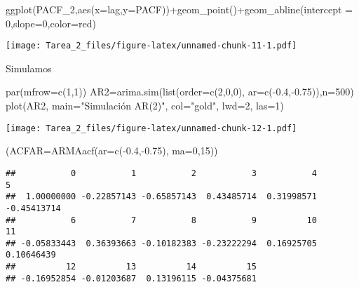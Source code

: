 \documentclass[
]{article}
\newenvironment{Shaded}{\begin{snugshade}}{\end{snugshade}}
\newcommand{\AttributeTok}[1]{\textcolor[rgb]{0.77,0.63,0.00}{#1}}
\newcommand{\DecValTok}[1]{\textcolor[rgb]{0.00,0.00,0.81}{#1}}
\newcommand{\FloatTok}[1]{\textcolor[rgb]{0.00,0.00,0.81}{#1}}
\newcommand{\FunctionTok}[1]{\textcolor[rgb]{0.00,0.00,0.00}{#1}}
\newcommand{\NormalTok}[1]{#1}
\newcommand{\OtherTok}[1]{\textcolor[rgb]{0.56,0.35,0.01}{#1}}
\newcommand{\SpecialCharTok}[1]{\textcolor[rgb]{0.00,0.00,0.00}{#1}}
\newcommand{\StringTok}[1]{\textcolor[rgb]{0.31,0.60,0.02}{#1}}
\begin{document}
\begin{Shaded}
\begin{Highlighting}[]
\FunctionTok{ggplot}\NormalTok{(PACF\_2,}\FunctionTok{aes}\NormalTok{(}\AttributeTok{x=}\NormalTok{lag,}\AttributeTok{y=}\NormalTok{PACF))}\SpecialCharTok{+}\FunctionTok{geom\_point}\NormalTok{()}\SpecialCharTok{+}\FunctionTok{geom\_abline}\NormalTok{(}\AttributeTok{intercept =} \DecValTok{0}\NormalTok{,}\AttributeTok{slope=}\DecValTok{0}\NormalTok{,}\AttributeTok{color=}\StringTok{\textquotesingle{}red\textquotesingle{}}\NormalTok{)}
\end{Highlighting}
\end{Shaded}

\texttt{[image: Tarea\_2\_files/figure-latex/unnamed-chunk-11-1.pdf]}

Simulamos

\begin{Shaded}
\begin{Highlighting}[]
\FunctionTok{par}\NormalTok{(}\AttributeTok{mfrow=}\FunctionTok{c}\NormalTok{(}\DecValTok{1}\NormalTok{,}\DecValTok{1}\NormalTok{))}
\NormalTok{AR2}\OtherTok{=}\FunctionTok{arima.sim}\NormalTok{(}\FunctionTok{list}\NormalTok{(}\AttributeTok{order=}\FunctionTok{c}\NormalTok{(}\DecValTok{2}\NormalTok{,}\DecValTok{0}\NormalTok{,}\DecValTok{0}\NormalTok{), }\AttributeTok{ar=}\FunctionTok{c}\NormalTok{(}\SpecialCharTok{{-}}\FloatTok{0.4}\NormalTok{,}\SpecialCharTok{{-}}\FloatTok{0.75}\NormalTok{)),}\AttributeTok{n=}\DecValTok{500}\NormalTok{)}
\FunctionTok{plot}\NormalTok{(AR2, }\AttributeTok{main=}\StringTok{"Simulación AR(2)"}\NormalTok{, }\AttributeTok{col=}\StringTok{"gold"}\NormalTok{, }\AttributeTok{lwd=}\DecValTok{2}\NormalTok{, }\AttributeTok{las=}\DecValTok{1}\NormalTok{)}
\end{Highlighting}
\end{Shaded}

\texttt{[image: Tarea\_2\_files/figure-latex/unnamed-chunk-12-1.pdf]}

\begin{Shaded}
\begin{Highlighting}[]
\NormalTok{(}\AttributeTok{ACFAR=}\FunctionTok{ARMAacf}\NormalTok{(}\AttributeTok{ar=}\FunctionTok{c}\NormalTok{(}\SpecialCharTok{{-}}\FloatTok{0.4}\NormalTok{,}\SpecialCharTok{{-}}\FloatTok{0.75}\NormalTok{), }\AttributeTok{ma=}\DecValTok{0}\NormalTok{,}\DecValTok{15}\NormalTok{))}
\end{Highlighting}
\end{Shaded}

\begin{verbatim}
##           0           1           2           3           4           5 
##  1.00000000 -0.22857143 -0.65857143  0.43485714  0.31998571 -0.45413714 
##           6           7           8           9          10          11 
## -0.05833443  0.36393663 -0.10182383 -0.23222294  0.16925705  0.10646439 
##          12          13          14          15 
## -0.16952854 -0.01203687  0.13196115 -0.04375681
\end{verbatim}
\end{document}
